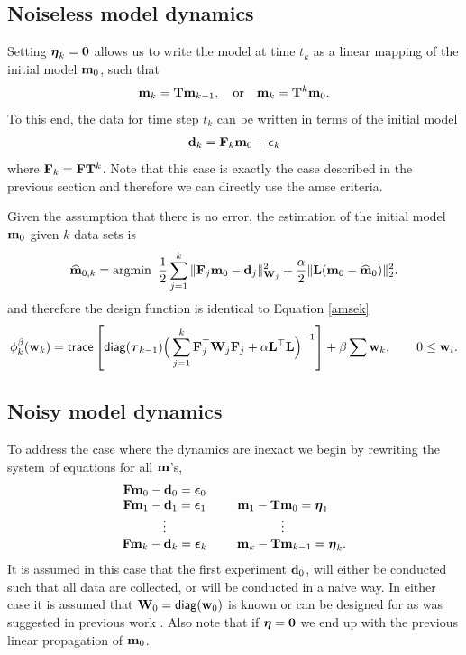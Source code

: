 \documentclass[final,leqno,onefignum,onetabnum]{siamltexmm}
\begin{document}
\subsection{Noiseless model dynamics}
Setting ${\boldsymbol \eta}_k = {\bf 0}$ allows us to 
write the model at time $t_k$ as a linear mapping of the initial model ${\bf{m}}_0$, such that
%
\begin{align}
{\bf{m}}_{k} = {\bf{T}}{\bf{m}}_{k-1}, \quad {\rm or } \quad
{\bf{m}}_{k} = {\bf{T}}^{k}{\bf{m}}_0.
\end{align} 
%
To this end, the data for time step $t_k$ can be written in terms of the initial model 
%
\begin{align}
{\bf{d}}_k = {\bf{F}}_k{\bf{m}}_0 + {\boldsymbol \epsilon}_k
\end{align}
%
where ${\bf{F}}_k = {\bf{F}}{\bf{T}}^{k}$.
Note that this case is exactly the case described in the previous section and therefore we can
directly use the amse criteria.

Given the assumption that there is no error, the estimation of the initial model ${\bf{m}}_0$ given $k$ data sets is 
%
\begin{align}
\label{m0NoNoise}
\bfmhat_{0,k} ={\rm argmin } \;\; \hf  \sum_{j=1}^{k}\| \bfF_{j}\bfm_0 - \bfd_j \|_{\bfW_j}^2 + \frac{\alpha}{2}\|\bfL(\bfm_0 - \bfmhat_{0})\|_2^2.
\end{align}
%
and therefore the design function is identical to Equation \eqref{amsek}
%
\begin{align}
\label{eq:noiselessOpt}
\phi_{k}^{\beta}(\bfw_{k}) =  {\sf trace} \left[  {\sf diag}(\bftau_{k-1}) \Big(\sum_{j=1}^{k}\bfF_{j}^{\top}\bfW_{j}\bfF_{j}   +
\alpha \LtL\Big)^{-1} \right] + \beta \sum \bfw_{k},\quad \quad 0 \le \bfw_i.
\end{align}
%

\subsection{Noisy model dynamics}
\label{sec:Noisy}
To address the case where the dynamics are inexact we begin by  
rewriting the system of equations for all  ${\bf{m}}$'s,
%
\begin{align}
\label{eq:noisy}
\begin{array}{cc}
\bfF\bfm_{0} - \bfd_0 = \bfepsilon_0 & \\
\bfF\bfm_{1} - \bfd_1 = \bfepsilon_1 & \bfm_1 -\bfT\bfm_0 = \bfeta_1 \\
\vdots & \vdots \\
\bfF\bfm_{k} - \bfd_k = \bfepsilon_k &  \;\;\;\;\;\bfm_k -\bfT\bfm_{k-1} = \bfeta_k.
\end{array}
\end{align} 
%
It is  assumed in this case that the first experiment ${\bf{d}}_0$, will either be conducted such that all data are collected,  or will be conducted in a naive way.  In either case it is assumed that ${\bf{W}}_0 = {\sf diag}({\bf{w}}_0)$ is known
or can be designed for as was suggested in previous work \cite{Haber2011}.
Also note that if ${\boldsymbol \eta} = {\bf 0}$ we end up with the previous linear propagation of ${\bf{m}}_{0}$. 
\end{document}
